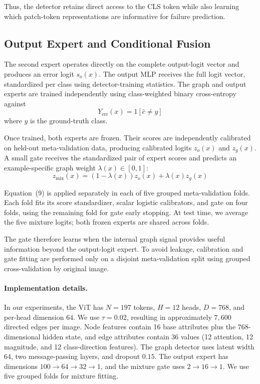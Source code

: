 \documentclass[11pt]{article}
\begin{document}
Thus, the detector retains direct access to the CLS token while also learning
which patch-token representations are informative for failure prediction.

\subsection{Output Expert and Conditional Fusion}

The second expert operates directly on the complete output-logit vector and
produces an error logit $s_o(x)$. The output MLP receives the full logit vector, standardized
per class using detector-training statistics. The graph and output experts are trained
independently using class-weighted binary cross-entropy against
\begin{equation}
Y_{\mathrm{err}}(x)
=
1
\left[
\hat c\neq y
\right]
\label{eq:error-target}
\end{equation}
where $y$ is the ground-truth class. 

Once trained, both experts are frozen. Their scores are independently
calibrated on held-out meta-validation data, producing calibrated logits
$z_o(x)$ and $z_g(x)$. A small gate receives the standardized pair of expert
scores and predicts an example-specific graph weight $\lambda(x)\in[0,1]$:
\begin{equation}
z_{\mathrm{mix}}(x)
=
\left(
1-\lambda(x)
\right)z_o(x)
+
\lambda(x)z_g(x)
\label{eq:conditional-mixture}
\end{equation}

Equation~(9) is applied separately in each of five grouped
meta-validation folds. Each fold fits its score standardizer,
scalar logistic calibrators, and gate on four folds, using the
remaining fold for gate early stopping. At test time, we average
the five mixture logits; both frozen experts are shared across
folds.

The gate therefore learns when the internal graph signal provides useful
information beyond the output-logit expert. To avoid leakage, calibration and
gate fitting are performed only on a disjoint meta-validation split using
grouped cross-validation by original image.

\paragraph{Implementation details.}
In our experiments, the ViT has $N=197$ tokens, $H=12$ heads,
$D=768$, and per-head dimension $64$. We use $\tau=0.02$, resulting in
approximately $7{,}600$ directed edges per image. Node features contain 16
base attributes plus the 768-dimensional hidden state, and edge attributes
contain 36 values (12 attention, 12 magnitude, and 12 class-direction
features). The graph detector uses latent width 64, two message-passing layers,
and dropout $0.15$. The output expert has dimensions
$100\!\rightarrow\!64\!\rightarrow\!32\!\rightarrow\!1$, and the mixture gate
uses $2\!\rightarrow\!16\!\rightarrow\!1$. We use five grouped folds for
mixture fitting.
\end{document}
